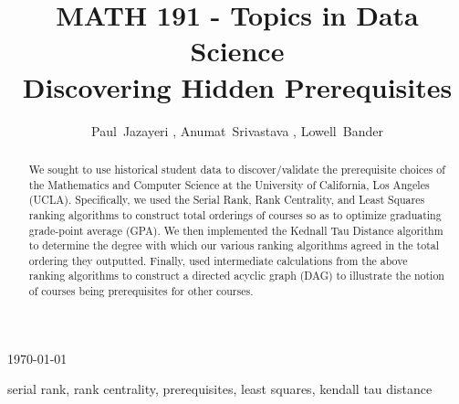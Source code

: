 \documentclass[10pt]{siamltex}
\begin{document}
\begin{pagewiselinenumbers}
\title{MATH 191 - Topics in Data Science\\ Discovering Hidden Prerequisites}
\author{Paul~Jazayeri \footnotemark[1], Anumat~Srivastava \footnotemark[2], Lowell~Bander \footnotemark[1]  }
\maketitle

\begin{center}
\today
\end{center}

\vspace{5mm}

\begin{abstract}
We sought to use historical student data to discover/validate the prerequisite choices of the Mathematics and Computer Science at the University of California, Los Angeles (UCLA). Specifically, we used the Serial Rank, Rank Centrality, and Least Squares ranking algorithms to construct total orderings of courses so as to optimize graduating grade-point average (GPA). We then implemented the Kednall Tau Distance algorithm to determine the degree with which our various ranking algorithms agreed in the total ordering they outputted. Finally, used intermediate calculations from the above ranking algorithms to construct a directed acyclic graph (DAG) to illustrate the notion of courses being prerequisites for other courses.
\end{abstract}

\begin{keywords} %
serial rank, rank centrality, prerequisites, least squares, kendall tau distance
\end{keywords}


\end{pagewiselinenumbers}
\end{document}
